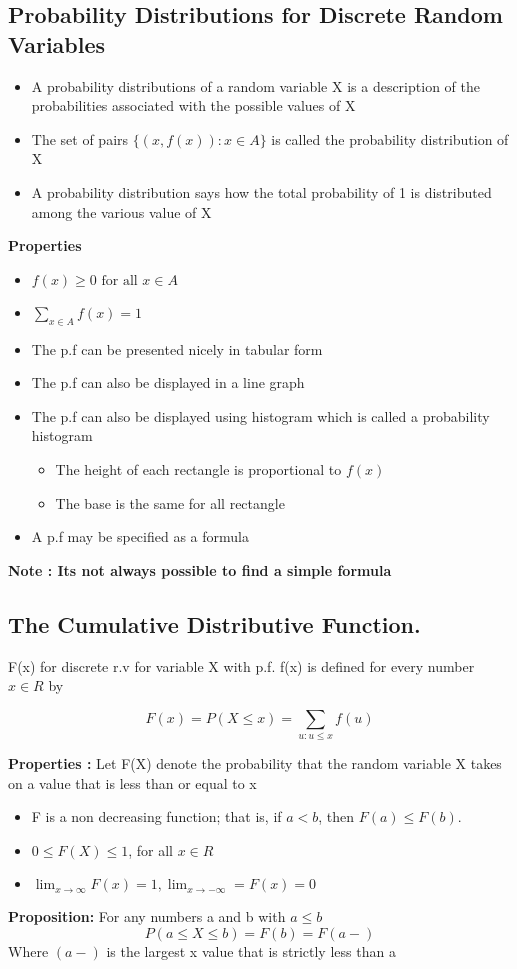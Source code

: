 \documentclass{article}
\begin{document}
\subsection{Probability Distributions for Discrete Random Variables}
\begin{itemize}
\item A probability distributions of a random variable X is a description of the probabilities associated with the possible values of X
\item The set of pairs \(\{ (x, f(x)) : x \in A \}\) is called the probability distribution of X
\item A probability distribution says how the total probability of 1 is distributed among the various value of X
\end{itemize}

\textbf{Properties}
\begin{itemize}
\item \(f(x) \geq 0 \text{ for all } x \in A \)
\item \(\sum_{x \in A} f(x) = 1 \)
\item The p.f can be presented nicely in tabular form
\item The p.f can also be displayed in a line graph
\item The p.f can also be displayed using histogram which is called a probability histogram 
\begin{itemize}
\item The height of each rectangle is proportional to \(f(x)\) 
\item The base is the same for all rectangle 
\end{itemize}
\item A p.f may be specified as a formula
\end{itemize}

\textbf{Note : Its not always possible to find a simple formula}

\subsection{The Cumulative Distributive Function. }

F(x) for discrete r.v for variable X with p.f. f(x) is defined for every number \(x \in R\) by 

$$ F(x) = P(X \leq x) = \sum_{u : u \leq x} f(u) $$

\textbf{Properties :} Let F(X) denote the probability that the random variable X takes on a value that is less than or equal to x
\begin{itemize}
\item F is a non decreasing function; that is, if \(a < b\), then \(F(a) \leq F(b)\).
\item \( 0 \leq F(X) \leq 1 \), for all \(x \in R\) 
\item \(\lim_{x \to \infty} F(x) = 1, \lim_{x \to -\infty} = F(x) = 0 \)
\end{itemize}
\textbf{Proposition:} For any numbers a and b with \(a \leq b\)
$$ P ( a \leq X \leq b) = F(b) = F(a -) $$
Where \((a -)\) is the largest x value that is strictly less than a
\end{document}
